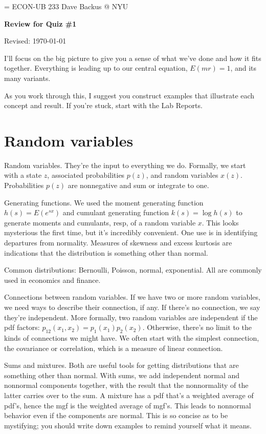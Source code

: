 \documentclass[11pt]{article}
\begin{document}
\parskip=\bigskipamount
\parindent=0.0in
\thispagestyle{empty}
{\large ECON-UB 233 \hfill Dave Backus @ NYU}

\bigskip\bigskip
\centerline{\Large \bf Review for Quiz \#1}
\centerline{Revised: \today}

\bigskip
I'll focus on the big picture to give you a sense of
what we've done and how it fits together.
Everything is leading up to our central equation,
$ E(mr) = 1$, and its many variants.

As you work through this, I suggest you construct examples that
illustrate each concept and result.
If you're stuck, start with the Lab Reports.


\section*{Random variables}

Random variables.  They're the input to everything we do.
Formally, we start with a state $z$, associated probabilities $p(z)$,
and random variables $x(z)$.
Probabilities $p(z)$ are nonnegative and sum or integrate to one.

Generating functions.
We used the moment generating function $h(s) = E (e^{sx})$
and cumulant generating function $k(s) = \log h(s)$ to
generate moments and cumulants, resp, of a random variable $x$.
This looks mysterious the first time, but it's incredibly convenient.
One use is in identifying departures from normality.
Measures of skewness and excess kurtosis are
indications that the distribution is something other than normal.

Common distributions:  Bernoulli, Poisson, normal, exponential.
All are commonly used in economics and finance.

Connections between random variables.
If we have two or more random variables, we need ways to describe
their connection, if any.
If there's no connection, we say they're independent.
More formally, two random variables are independent if the pdf factors:
$ p_{12}(x_1, x_2) = p_1(x_1) p_2(x_2) $.
Otherwise, there's no limit to the kinds of connections we might have.
We often start with the simplest connection,
the covariance or correlation, which is a measure of linear connection.

Sums and mixtures.
Both are useful tools for getting distributions that are something other than normal.
With sums, we add independent normal and nonnormal components together,
with the result that the nonnormality of the latter carries over to the sum.
A mixture has a pdf that's a weighted average
of pdf's, hence the mgf is the weighted average of mgf's.
This leads to nonnormal behavior even if the components are normal.
This is so concise as to be mystifying; you should write down examples
to remind yourself what it means.
\end{document}
